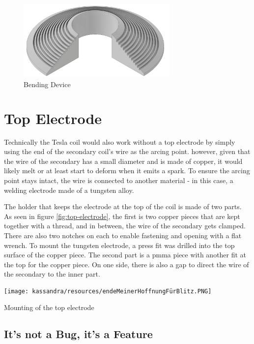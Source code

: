 \begin{figure}[h!]
    \centering
    \includegraphics[width=0.7\textwidth]{kassandra/resources/JerJerWoBistDuBiegeBieg.PNG}
    \caption{Bending Device}
    \label{fig:biegbieg}
\end{figure}

\section{Top Electrode}

Technically the Tesla coil would also work without a top electrode by simply using the end of the secondary coil's wire as the arcing point. however, given that the wire of the secondary has a small diameter and is made of copper, it would likely melt or at least start to deform when it emits a spark. To ensure the arcing point stays intact, the wire is connected to another material - in this case, a welding electrode made of a tungsten alloy. 

The holder that keeps the electrode at the top of the coil is made of two parts. As seen in figure \ref{fig:top-electrode}, the first is two copper pieces that are kept together with a thread, and in between, the wire of the secondary gets clamped. There are also two notches on each to enable fastening and opening with a flat wrench. To mount the tungsten electrode, a press fit was drilled into the top surface of the copper piece. The second part is a \gls{pmma} piece with another fit at the top for the copper piece. On one side, there is also a gap to direct the wire of the secondary to the inner part. 

\begin{marginfigure}[-8cm]
    \centering
    \texttt{[image: kassandra/resources/endeMeinerHoffnungFürBlitz.PNG]}
    \caption{Mounting of the top electrode}
    \label{fig:top-electrode}
\end{marginfigure}

\subsection{It's not a Bug, it's a Feature}

